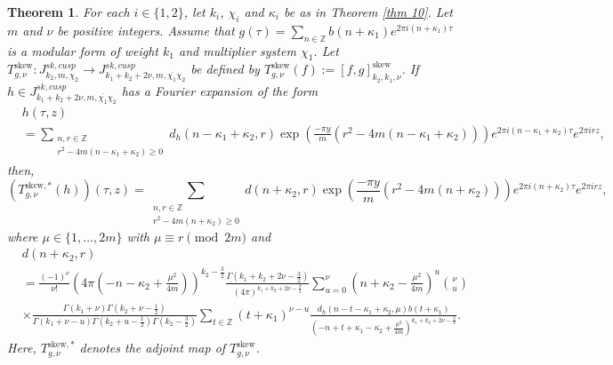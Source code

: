 \documentclass[11pt]{amsart}
\newtheorem{thm}{Theorem}[section]
\theoremstyle{definition}
\theoremstyle{remark}
\numberwithin{equation}{section}
\renewcommand{\(}{\left(}
\renewcommand{\)}{\right)}
\begin{document}
\begin{thm}\label{thm 11}
    For each $i\in \{1,2\}$, let $k_i$, $\chi_i$ and $\kappa_i$ be as in Theorem \ref{thm 10}.
    Let $m$ and $\nu$ be positive integers.
    Assume that $g(\tau)=\sum_{n\in \mathbb{Z}} b(n+\kappa_1)e^{2\pi i (n+\kappa_1)\tau}$ is a modular form of weight $k_1$ and multiplier system $\chi_1$.
    Let $T^{\mathrm{skew}}_{g,\nu} : J^{sk,cusp}_{k_2,m,\chi_2}\to J^{sk,cusp}_{k_1+k_2+2\nu,m,\overline{\chi_1}\chi_2}$ be defined by $T^{\mathrm{skew}}_{g,\nu}(f):=[f,g]^{\mathrm{skew}}_{k_2,k_1,\nu}$. 
    If $h\in J^{sk,cusp}_{k_1+k_2+2\nu,m,\overline{\chi_1}\chi_2}$ has a Fourier expansion of the form
    \begin{equation*}
        \begin{aligned}
            &h(\tau,z)\\
            &=\sum_{\substack{n,r\in \mathbb{Z}\\r^2-4m(n-\kappa_1+\kappa_2)\geq 0}} d_{h}(n-\kappa_1+\kappa_2,r)\exp\left(\frac{-\pi y}{m}\left(r^2-4m(n-\kappa_1+\kappa_2)\right)\right) e^{2\pi i (n-\kappa_1+\kappa_2)\tau}e^{2\pi i r z},
        \end{aligned}
    \end{equation*}
    then, 
    \[ \left(T^{\mathrm{skew},*}_{g,\nu}(h)\right)(\tau,z)=\sum_{\substack{n,r\in \mathbb{Z}\\r^2-4m(n+\kappa_2)\geq 0}} d(n+\kappa_2,r)\exp\left(\frac{-\pi y}{m}\left(r^2-4m(n+\kappa_2)\right)\right) e^{2\pi i (n+\kappa_2)\tau}e^{2\pi i r z}, \]
    where $\mu\in\{1,\dots,2m\}$ with $\mu\equiv r\pmod{2m}$ and
    \begin{equation*}
        \begin{aligned}
            &d(n+\kappa_2,r)\\
            &=\frac{(-1)^{\nu}}{\nu!}(4\pi(-n-\kappa_{2}+\frac{\mu^2}{4m}))^{k_2-\frac{3}{2}}\frac{\Gamma(k_1+k_2+2\nu-\frac{3}{2})}{(4\pi)^{k_1+k_2+2\nu-\frac{3}{2}}}\sum_{u=0}^{\nu} (n+\kappa_{2}-\frac{\mu^2}{4m})^{u}\binom{\nu}{u}\\
            &\times\frac{\Gamma(k_1+\nu)\Gamma(k_2+\nu-\frac{1}{2})}{\Gamma(k_1+\nu-u)\Gamma(k_2+u-\frac{1}{2})\Gamma(k_2-\frac{3}{2})}\sum_{t\in \mathbb{Z}} (t+\kappa_{1})^{\nu-u}\frac{d_h(n-t-\kappa_{1}+\kappa_{2},\mu)b(t+\kappa_{1})}{(-n+t+\kappa_{1}-\kappa_{2}+\frac{\mu^2}{4m})^{k_1+k_2+2\nu-\frac{3}{2}}}.
        \end{aligned}
    \end{equation*}
Here, $T^{\mathrm{skew},*}_{g,\nu}$ denotes the adjoint map of $T^{\mathrm{skew}}_{g,\nu}$.
    
\end{thm}
\end{document}
